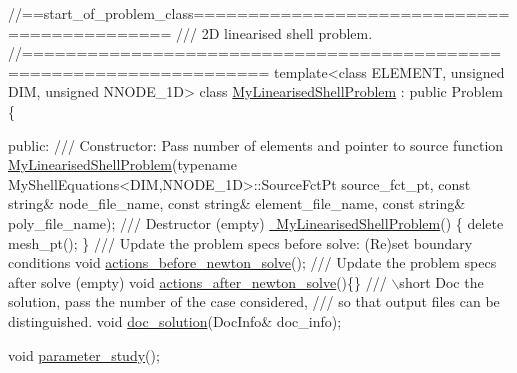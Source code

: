  
\begin{DoxyCodeInclude}
\textcolor{comment}{//==start\_of\_problem\_class============================================}
\textcolor{comment}{/// 2D linearised shell problem.}
\textcolor{comment}{}\textcolor{comment}{//====================================================================}
\textcolor{keyword}{template}<\textcolor{keyword}{class} ELEMENT, \textcolor{keywordtype}{unsigned} DIM, \textcolor{keywordtype}{unsigned} NNODE\_1D> 
\textcolor{keyword}{class }\hyperlink{classMyLinearisedShellProblem}{MyLinearisedShellProblem} : \textcolor{keyword}{public} Problem
\{

\textcolor{keyword}{public}:
\textcolor{comment}{}
\textcolor{comment}{ /// Constructor: Pass number of elements and pointer to source function}
\textcolor{comment}{} \hyperlink{classMyLinearisedShellProblem_a2ccc4ed3e631ca68d1d86423ef8eeb03}{MyLinearisedShellProblem}(\textcolor{keyword}{typename} MyShellEquations<DIM,NNODE\_1D>::SourceFctPt 
      source\_fct\_pt,
                          \textcolor{keyword}{const} \textcolor{keywordtype}{string}& node\_file\_name,
                          \textcolor{keyword}{const} \textcolor{keywordtype}{string}& element\_file\_name,
                          \textcolor{keyword}{const} \textcolor{keywordtype}{string}& poly\_file\_name);
\textcolor{comment}{}
\textcolor{comment}{ /// Destructor (empty)}
\textcolor{comment}{} \hyperlink{classMyLinearisedShellProblem_a8720e7226adb9f23266fe729f7e4eb5a}{~MyLinearisedShellProblem}()
  \{
   \textcolor{keyword}{delete} mesh\_pt();
  \}
\textcolor{comment}{}
\textcolor{comment}{ /// Update the problem specs before solve: (Re)set boundary conditions}
\textcolor{comment}{} \textcolor{keywordtype}{void} \hyperlink{classMyLinearisedShellProblem_a81d050ee6958694b7645ea73cc8e4e9f}{actions\_before\_newton\_solve}();
\textcolor{comment}{}
\textcolor{comment}{ /// Update the problem specs after solve (empty)}
\textcolor{comment}{} \textcolor{keywordtype}{void} \hyperlink{classMyLinearisedShellProblem_a8ad6606f22859a5bd32d238bcc10efd1}{actions\_after\_newton\_solve}()\{\}
\textcolor{comment}{}
\textcolor{comment}{ /// \(\backslash\)short Doc the solution, pass the number of the case considered,}
\textcolor{comment}{ /// so that output files can be distinguished.}
\textcolor{comment}{} \textcolor{keywordtype}{void} \hyperlink{classMyLinearisedShellProblem_a5894d8fae239fd5255b6a661cbc23fa5}{doc\_solution}(DocInfo& doc\_info);

 \textcolor{keywordtype}{void} \hyperlink{classMyLinearisedShellProblem_ab9255e3cbaae69ad5d61757d891b633e}{parameter\_study}();


\end{DoxyCodeInclude}

